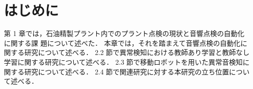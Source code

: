 \documentclass[../main]{subfiles}
\begin{document}
\section{はじめに}
第 1 章では，石油精製プラント内でのプラント点検の現状と音響点検の自動化に関する課
題について述べた．
本章では，それを踏まえて音響点検の自動化に関する研究について述べる．
2.2 節で異常検知における教師あり学習と教師なし学習に関する研究について述べる．
2.3 節で移動ロボットを用いた異常音検知に関する研究について述べる．
2.4 節で関連研究に対する本研究の立ち位置について述べる．
\end{document}
